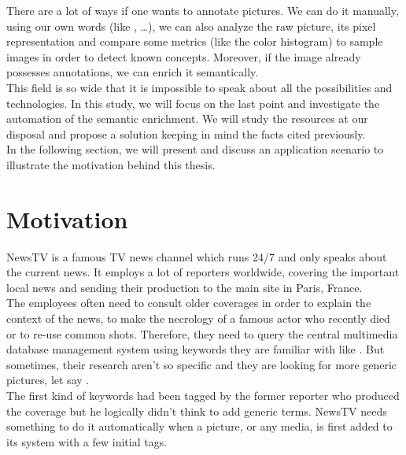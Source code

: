 There are a lot of ways if one wants to annotate pictures. We can do it manually, using our own words (like ,  \dots), we can also analyze the raw picture, its pixel representation and compare some metrics (like the color histogram) to sample images in order to detect known concepts. Moreover, if the image already possesses annotations, we can enrich it semantically. \\

This field is so wide that it is impossible to speak about all the possibilities and technologies. In this study, we will focus on the last point and investigate the automation of the semantic enrichment. We will study the resources at our disposal and propose a solution keeping in mind the facts cited previously.\\

In the following section, we will present and discuss an application scenario to illustrate the motivation behind this thesis.



\section{Motivation} %
\label{sec:motivation}

NewsTV is a famous TV news channel which runs 24/7 and only speaks about the current news. It employs a lot of reporters worldwide, covering the important local news and sending their production to the main site in Paris, France.\\

The employees often need to consult older coverages in order to explain the context of the news, to make the necrology of a famous actor who recently died or to re-use common shots. 
Therefore, they need to query the central multimedia database management system using keywords they are familiar with like . But sometimes, their research aren't so specific and they are looking for more generic pictures, let say .\\

The first kind of keywords had been tagged by the former reporter who produced the coverage but he logically didn't think to add generic terms. NewsTV needs something to do it automatically when a picture, or any media, is first added to its system with a few initial tags.\\

